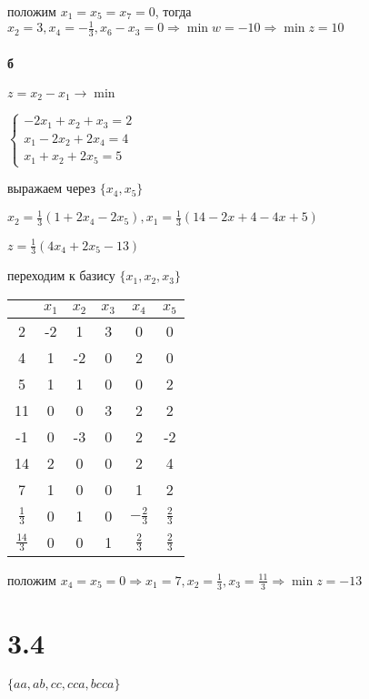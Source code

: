 \documentclass[russian]{article}
\begin{document}
положим $x_1=x_5 = x_7 =0$, тогда $x_2 = 3, x_4 = - \frac{1}{3}, x_6 - x_3 = 0 \Rightarrow \min w = -10 \Rightarrow \min z = 10$

\paragraph{б}

$z = x_2 - x_1 \to \min$

$\begin{cases}
-2 x_1 + x_2 + x_3 = 2 \\
x_1 - 2x_2 + 2 x_4 = 4 \\
x_1 + x_2 + 2 x_5 = 5
\end{cases}$

выражаем через $\{x_4, x_5\}$

$ x_2 = \frac{1}{3}(1  + 2 x_4 - 2 x_5) , x_1 = \frac{1}{3}(14 - 2 x+4 - 4 x+5)$

$z = \frac{1}{3}(4 x_4 + 2 x_5 - 13)$

переходим к базису $\{ x_1, x_2, x_3\}$

\begin{tabular}{|c|ccccc|}\hline
& $x_1$ & $x_2$ & $x_3$ & $x_4$ & $x_5$ \\\hline

2 & -2 & 1 & 3 & 0 & 0 \\
4 & 1 & -2 & 0 & 2 & 0 \\
5 & 1 & 1 & 0 & 0 & 2 \\\hline

11 & 0 & 0 & 3 & 2 & 2 \\
-1 & 0 & -3 & 0 & 2 & -2 \\
14 & 2 & 0 & 0 & 2 & 4  \\\hline

7 & 1 & 0 & 0 & 1 & 2 \\
$\frac{1}{3}$ & 0 & 1 & 0 & $-\frac{2}{3}$ & $\frac{2}{3}$ \\
$\frac{14}{3}$ & 0 & 0 & 1 & $\frac{2}{3}$ & $\frac{2}{3}$ \\\hline

\end{tabular}

положим $x_4=x_5 = 0 \Rightarrow x_1 = 7, x_2 = \frac{1}{3},x_3 = \frac{11}{3} \Rightarrow \min z = -13$

\section*{3.4}

$\{aa,ab,cc,cca,bcca\}$
\end{document}
